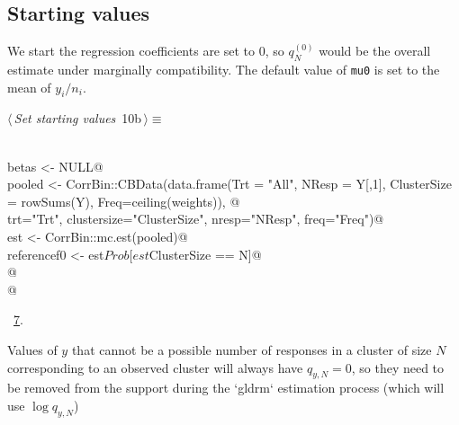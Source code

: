 \documentclass[reqno]{amsart}
\renewcommand{\NWtarget}[2]{\hypertarget{#1}{#2}}
\renewcommand{\NWlink}[2]{\hyperlink{#1}{#2}}
\begin{document}
\subsection{Starting values}
We start the regression coefficients are set to 0, so $q^{(0)}_N$ would be the overall estimate under marginally compatibility. The default value of \texttt{mu0} is set to the mean of $y_i/n_i$.

\begin{flushleft} \small\label{scrap11}\raggedright\small
\NWtarget{nuweb10b}{} $\langle\,${\itshape Set starting values}\nobreak\ {\footnotesize {10b}}$\,\rangle\equiv$
\vspace{-1ex}
\begin{list}{}{} \item
\mbox{}\verb@@\\
\mbox{}\verb@  betas <- NULL@\\
\mbox{}\verb@  pooled <- CorrBin::CBData(data.frame(Trt = "All", NResp = Y[,1], ClusterSize = rowSums(Y), Freq=ceiling(weights)), @\\
\mbox{}\verb@                    trt="Trt", clustersize="ClusterSize", nresp="NResp", freq="Freq")@\\
\mbox{}\verb@  est <- CorrBin::mc.est(pooled)@\\
\mbox{}\verb@  referencef0 <- est$Prob[est$ClusterSize == N]@\\
\mbox{}\verb@  @\\
\mbox{}\verb@  @\\
\mbox{}\verb@@{\NWsep}
\end{list}
\vspace{-1.5ex}
\footnotesize
\begin{list}{}{\setlength{\itemsep}{-\parsep}\setlength{\itemindent}{-\leftmargin}}
\item \NWtxtMacroRefIn\ \NWlink{nuweb7}{7}.

\item{}
\end{list}
\vspace{4ex}
\end{flushleft}
Values of $y$ that cannot be a possible number of responses in a cluster of size $N$ corresponding to an observed cluster will always have $q_{y,N}=0$, so they need to be removed from the support during the `gldrm` estimation process (which will use $\log q_{y,N}$)
\end{document}
